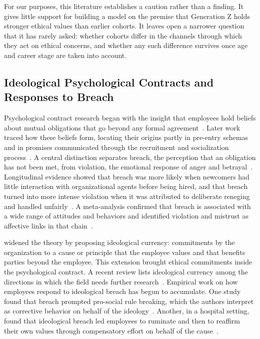 \documentclass[12pt,a4paper]{article}
\theoremstyle{definition}
\begin{document}
For our purposes, this literature establishes a caution rather than a finding. It gives little support for building a model on the premise that Generation Z holds stronger ethical values than earlier cohorts. It leaves open a narrower question that it has rarely asked: whether cohorts differ in the channels through which they act on ethical concerns, and whether any such difference survives once age and career stage are taken into account.

\subsection{Ideological Psychological Contracts and Responses to Breach}

Psychological contract research began with the insight that employees hold beliefs about mutual obligations that go beyond any formal agreement~\citep{rousseau1989psychological}. Later work traced how these beliefs form, locating their origins partly in pre-entry schemas and in promises communicated through the recruitment and socialization process~\citep{rousseau2001schema}. A central distinction separates breach, the perception that an obligation has not been met, from violation, the emotional response of anger and betrayal~\citep{morrison1997employees}. Longitudinal evidence showed that breach was more likely when newcomers had little interaction with organizational agents before being hired, and that breach turned into more intense violation when it was attributed to deliberate reneging and handled unfairly~\citep{robinson2000development}. A meta-analysis confirmed that breach is associated with a wide range of attitudes and behaviors and identified violation and mistrust as affective links in that chain~\citep{zhao2007impact}.

\citet{thompson2003violations} widened the theory by proposing ideological currency: commitments by the organization to a cause or principle that the employee values and that benefits parties beyond the employee. This extension brought ethical commitments inside the psychological contract. A recent review lists ideological currency among the directions in which the field needs further research~\citep{coyleshapiro2019psychological}. Empirical work on how employees respond to ideological breach has begun to accumulate. One study found that breach prompted pro-social rule breaking, which the authors interpret as corrective behavior on behalf of the ideology~\citep{yang2022going}. Another, in a hospital setting, found that ideological breach led employees to ruminate and then to reaffirm their own values through compensatory effort on behalf of the cause~\citep{deng2023serving}.
\end{document}
